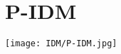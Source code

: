 \documentclass[../../DD.tex]{subfiles}
\begin{document}
\section{P-IDM \label{sect:2.1}}
	\texttt{[image: IDM/P-IDM.jpg]}
\end{document}
